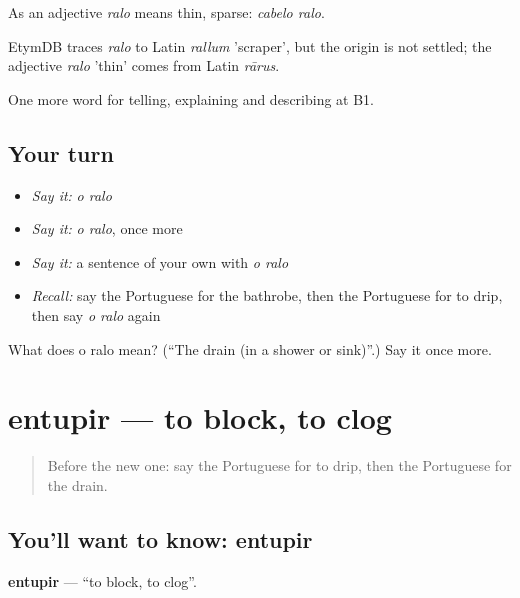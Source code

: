 As an adjective \emph{ralo} means thin, sparse: \emph{cabelo ralo}.

\begin{cousinweb}
EtymDB traces \emph{ralo} to Latin \emph{rallum} 'scraper', but the origin is not settled; the adjective \emph{ralo} 'thin' comes from Latin \emph{rārus}.
\end{cousinweb}

\begin{grammarlens}[title={What you've built}]
One more word for telling, explaining and describing at B1.
\end{grammarlens}

\subsection*{Your turn}
\begin{itemize}
\raggedright
  \item \emph{Say it:} \emph{o ralo}
  \item \emph{Say it:} \emph{o ralo}, once more
  \item \emph{Say it:} a sentence of your own with \emph{o ralo}
  \item \emph{Recall:} say the Portuguese for the bathrobe, then the Portuguese for to drip, then say \emph{o ralo} again
\end{itemize}

\begin{tcolorbox}[breakable,colback=teal!4,colframe=teal!35!black,title={Before you move on}]
What does o ralo mean? (\textquotedblleft{}The drain (in a shower or sink)\textquotedblright{}.) Say it once more.
\end{tcolorbox}
\section[entupir]{entupir — to block, to clog}

\label{lesson:PT-C430-entupir}



\begin{quote}
Before the new one: say the Portuguese for to drip, then the Portuguese for the drain.
\end{quote}

\subsection*{You'll want to know: entupir}
\textbf{entupir} — \textquotedblleft{}to block, to clog\textquotedblright{}.

